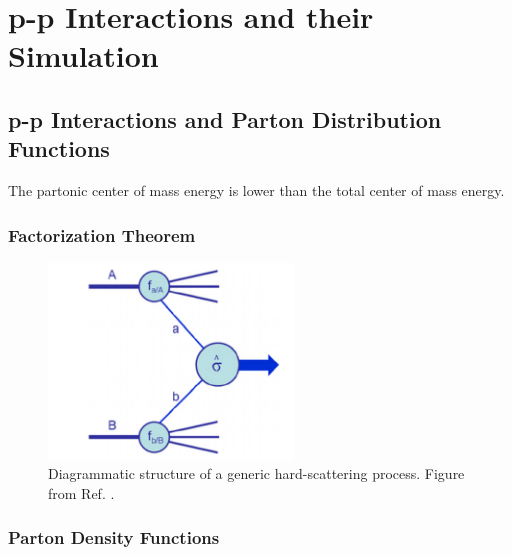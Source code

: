 \chapter{p-p Interactions and their Simulation}
\label{chap:event:MC}

\section{p-p Interactions and Parton Distribution Functions}

The partonic center of mass energy \cmpart is lower than the total center of mass energy.

\subsection{Factorization Theorem}



\begin{figure}[h]
\begin{center}
    \includegraphics[width=0.58\textwidth]{figures/simul/ppcoll}
\end{center}
 \caption{Diagrammatic structure of a generic hard-scattering process. Figure from Ref. \cite{Campbell:2006wx}.}
  \label{fig:sim:pp}
\end{figure}

\subsection{Parton Density Functions}

